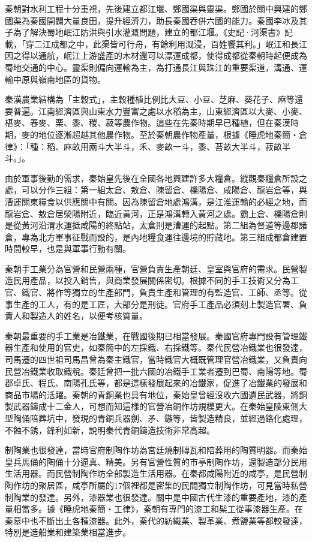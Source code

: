 秦朝對水利工程十分重視，先後建立都江堰、鄭國渠與靈渠。鄭國於關中興建的鄭國渠為秦國開闢大量良田，提升經濟力，助長秦國吞併六國的能力。秦國李冰及其子為了解決蜀地岷江防洪與引水灌溉問題，建立的都江堰。《史記·河渠書》記載，「穿二江成都之中，此渠皆可行舟，有餘利用溉浸，百姓饗其利。」岷江和長江因之得以通航，岷江上游盛產的木材還可以漂運成都，使得成都從秦朝時起便成為蜀地交通的中心。靈渠則偏向運輸為主，為打通長江與珠江的重要渠道，溝通、運輸中原與嶺南地區的貨物。

秦漢農業結構為「主穀式」，主穀種植比例比大豆、小豆、芝麻、葵花子、麻等還要普遍。江南經濟區與山東水力豐富之處以水稻為主，山東經濟區以大麥、小麥、椹麥、春麥、栗、黍、稷、菽等農作物。這些在先秦時期早已種植，但在秦漢時期，麥的地位逐漸超越其他農作物。至於秦朝農作物產量，根據《睡虎地秦簡‧倉律》：「種：稻、麻畝用兩斗大半斗，禾、麥畝一斗，黍、苔畝大半斗，菽畝半斗。」。

由於軍事後勤的需求，秦始皇先後在全國各地興建許多大糧倉。縱觀秦糧倉所設之處，可以分作三組：第一組太倉、敖倉、陳留倉、櫟陽倉、咸陽倉、龍岩倉等，與漕運關東糧食以供應關中有關。因為陳留倉地處鴻溝，是江淮運輸的必經之地，而龍岩倉、敖倉居滎陽附近，臨近黃河，正是鴻溝轉入黃河之處。霸上倉、櫟陽倉則是從黃河沿渭水運抵咸陽的終點站，太倉則是漕運的起點。第二組為督道等邊郡諸倉，專為北方軍事征戰而設的，是內地糧食運往邊境的貯藏地。第三組成都倉建置時間較早，也是與軍事行動有關。

秦朝手工業分為官營和民營兩種，官營負責生產朝廷、皇室與官府的需求。民營製造民用產品，以投入銷售，與商業發展關係密切。根據不同的手工技術又分為工官、鐵官、將作等獨立的生產部門，負責生產和管理的有監造官、工師、丞等。從事生產的工人，有的是工匠，大部分是刑徒。官府手工產品必須刻上製造官署、負責人和製造人的姓名，以便考核質量。 　　

秦朝最重要的手工業是冶鐵業，在戰國後期已相當發展。秦國官府專門設有管理鐵器生產和使用的官吏，如秦簡中的左採鐵、右採鐵等。秦代民營冶鐵業也很發達，司馬遷的四世祖司馬昌曾為秦主鐵官，當時鐵官大概既管理官營冶鐵業，又負責向民營冶鐵業收取鐵稅。秦廷曾把一批六國的冶鐵手工業者遷到巴蜀、南陽等地。蜀郡卓氏、程氏、南陽孔氏等，都是這樣發展起來的冶鐵家，促進了冶鐵業的發展和商品市場的活躍。秦朝的青銅業也具有地位，秦始皇曾經沒收六國遺民武器，將銅製武器鑄成十二金人，可想而知這樣的官營冶銅作坊規模更大。在秦始皇陵東側大型陶俑陪葬坑中，發現的青銅兵器劍、矛、鏃等，皆製造精良，並經過鉻化處理，不蝕不銹，鋒利如新，說明秦代青銅鑄造技術非常高超。

制陶業也很發達，當時官府制陶作坊為宮廷燒制磚瓦和陪葬用的陶質明器。而秦始皇兵馬俑的陶俑十分逼真、精美。另有官營性質的市亭制陶作坊，還製造部分民用生活用器。而民營制陶作坊全部製造生活用器。在秦都咸陽附近的咸亭，是民營制陶作坊的聚居區，咸亭所屬的17個裡都是密集的民間獨立制陶作坊，可見當時私營制陶業的發達。另外，漆器業也很發達。關中是中國古代生漆的重要產地，漆的產量相當多。據《睡虎地秦簡‧工律》，秦朝有專門的漆工和髤工從事漆器生產。在秦墓中也不斷出土各種漆器。此外，秦代的紡織業、製革業、煮鹽業等都較發達，特別是造船業和建築業相當進步。　

